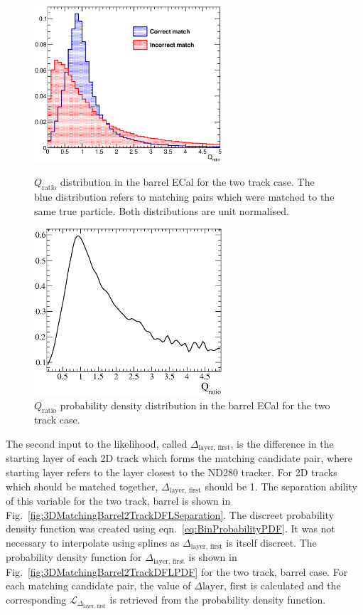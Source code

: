 \begin{figure}
  \centering
  \parbox{7cm}{
    \includegraphics[width=7cm]{images/hough_3d_matching/3DMatching_Barrel_2Track_QRatio_Separation.eps}
    \caption{$Q_{\textrm{ratio}}$ distribution in the barrel ECal for the two track case.  The blue distribution refers to matching pairs which were matched to the same true particle.  Both distributions are unit normalised.}
    \label{fig:3DMatchingBarrel2TrackQRatioSeparation}}
    \qquad
    \begin{minipage}{7cm}
      \includegraphics[width=7cm]{images/hough_3d_matching/3DMatching_Barrel_2Track_QRatio_PDF.eps}
      \caption{$Q_{\textrm{ratio}}$ probability density distribution in the barrel ECal for the two track case.}
      \label{fig:3DMatchingBarrel2TrackQRatioPDF}
    \end{minipage}
\end{figure}
\newline
The second input to the likelihood, called $\Delta_{\textrm{layer, first}}$, is the difference in the starting layer of each 2D track which forms the matching candidate pair, where starting layer refers to the layer closest to the ND280 tracker.  For 2D tracks which should be matched together, $\Delta_{\textrm{layer, first}}$ should be 1.  The separation ability of this variable for the two track, barrel is shown in Fig.~\ref{fig:3DMatchingBarrel2TrackDFLSeparation}.  The discreet probability density function was created using eqn.~\ref{eq:BinProbabilityPDF}.  It was not necessary to interpolate using splines as $\Delta_{\textrm{layer, first}}$ is itself discreet.  The probability density function for $\Delta_{\textrm{layer, first}}$ is shown in Fig.~\ref{fig:3DMatchingBarrel2TrackDFLPDF} for the two track, barrel case.  For each matching candidate pair, the value of $\Delta{\textrm{layer, first}}$ is calculated and the corresponding $\mathcal{L}_{\Delta_{\textrm{layer, first}}}$ is retrieved from the probability density function.
